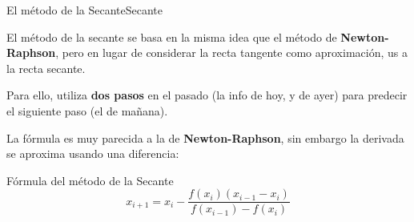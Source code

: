 \documentclass[spanish, c]{beamer}
\begin{document}
\begin{frame}{El método de la Secante}{Secante}

    El método de la \alert{secante} se basa en la misma idea que el método de \textbf{Newton-Raphson}, pero en lugar de considerar la recta tangente como aproximación, us a la recta secante. \pause

    \bigskip

    Para ello, utiliza \textbf{dos pasos} en el pasado (la info de hoy, y de ayer) para predecir el siguiente paso (el de mañana). \pause
    
    \bigskip

    La fórmula es muy parecida a la de \textbf{Newton-Raphson}, sin embargo la derivada se aproxima usando una diferencia:

    \begin{block}{Fórmula del método de la Secante}
        $$x_{i+1} = x_i - \frac{f(x_i)(x_{i-1} - x_i)}{f(x_{i-1}) - f(x_i)}$$
    \end{block}

\end{frame}




\end{document}
